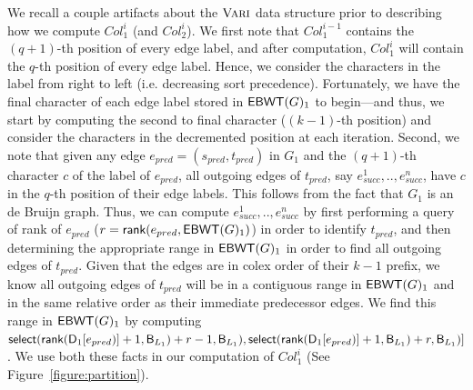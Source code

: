                         We recall a couple artifacts about the $\mbox{\rm {\sc Vari}}$ data structure prior to describing how we compute $Col_1^i$ (and $Col_2^i$).  We first note that $Col_1^{i-1}$ contains the $(q + 1)$-th position of every edge label, and after computation, $Col_1^i$ will contain the $q$-th position of every edge label.  Hence, we consider the characters in the label from right to left (i.e. decreasing sort precedence).  Fortunately, we have the final character of each edge label stored in $\mathsf{EBWT}(G)_1$ to begin---and thus, we  start by computing the second to final character ($(k-1)$-th position) and consider the characters in the decremented position at each iteration.   Second, we note that given any edge $e_{pred} = (s_{pred}, t_{pred})$ in $G_1$ and the $(q + 1)$-th character $c$ of the label of $e_{pred}$, all outgoing edges of $t_{pred}$, say $e_{succ}^1,..,e_{succ}^n$, have $c$ in the $q$-th position of their edge labels. This follows from the fact that $G_1$ is an de Bruijn graph.   Thus, we can compute $e_{succ}^1,..,e_{succ}^n$  by first performing a query of rank of $e_{pred}$ ($r = \textsf{rank}(e_{pred}, \mathsf{EBWT}(G)_1)$) in order to identify $t_{pred}$, and then determining the appropriate range in $\mathsf{EBWT}(G)_1$ in order to find all outgoing edges of $t_{pred}$.  Given that the edges are in colex order of their $k-1$ prefix, we know all outgoing edges of $t_{pred}$ will be in a contiguous range in $\mathsf{EBWT}(G)_1$ and in the same relative order as their immediate predecessor edges. We find this range in $\mathsf{EBWT}(G)_1$ by computing $\select(\rank(\D_1[\label(e_{pred})] + 1, \B_{L_1}) + r - 1, \B_{L_1}),  \select(\rank(\D_1[\label(e_{pred})] + 1, \B_{L_1}) + r, \B_{L_1})]$.  We  use both these facts in our computation of $Col_1^i$  (See Figure~\ref{figure:partition}).

